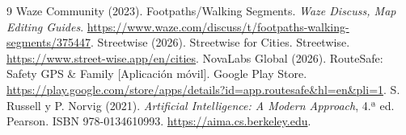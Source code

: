 \documentclass[11pt]{article}
\begin{document}
\begin{thebibliography}{9}
   Waze Community (2023). Footpaths/Walking Segments. \emph{Waze Discuss, Map Editing
    Guides}. \url{https://www.waze.com/discuss/t/footpaths-walking-segments/375447}.
   Streetwise (2026). Streetwise for Cities. Streetwise.
    \url{https://www.street-wise.app/en/cities}.
   NovaLabs Global (2026). RouteSafe: Safety GPS \& Family [Aplicación móvil].
    Google Play Store. \url{https://play.google.com/store/apps/details?id=app.routesafe&hl=en&pli=1}.
   S. Russell y P. Norvig (2021). \emph{Artificial Intelligence: A Modern
    Approach}, 4.ª ed. Pearson. ISBN 978-0134610993. \url{https://aima.cs.berkeley.edu}.
\end{thebibliography}
\end{document}
